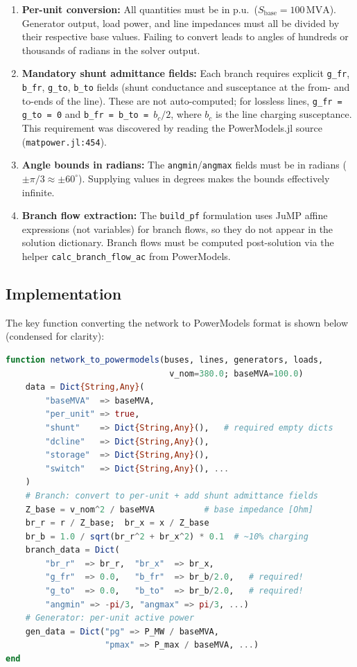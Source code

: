\begin{enumerate}
    \item \textbf{Per-unit conversion:} All quantities must be in p.u.\ ($S_\text{base} = 100\,\text{MVA}$). Generator output, load power, and line impedances must all be divided by their respective base values. Failing to convert leads to angles of hundreds or thousands of radians in the solver output.

    \item \textbf{Mandatory shunt admittance fields:} Each branch requires explicit \texttt{g\_fr}, \texttt{b\_fr}, \texttt{g\_to}, \texttt{b\_to} fields (shunt conductance and susceptance at the from- and to-ends of the line). These are not auto-computed; for lossless lines, \texttt{g\_fr = g\_to = 0} and \texttt{b\_fr = b\_to = $b_c/2$}, where $b_c$ is the line charging susceptance. This requirement was discovered by reading the PowerModels.jl source (\texttt{matpower.jl:454}).

    \item \textbf{Angle bounds in radians:} The \texttt{angmin}/\texttt{angmax} fields must be in radians ($\pm\pi/3 \approx \pm60^{\circ}$). Supplying values in degrees makes the bounds effectively infinite.

    \item \textbf{Branch flow extraction:} The \texttt{build\_pf} formulation uses JuMP affine expressions (not variables) for branch flows, so they do not appear in the solution dictionary. Branch flows must be computed post-solution via the helper \texttt{calc\_branch\_flow\_ac} from PowerModels.
\end{enumerate}

\subsection{Implementation}

The key function converting the network to PowerModels format is shown below (condensed for clarity):

\begin{lstlisting}[language=Julia, caption={PowerModels.jl data format construction (key fields)}, label={lst:ac_format}]
function network_to_powermodels(buses, lines, generators, loads,
                                 v_nom=380.0; baseMVA=100.0)
    data = Dict{String,Any}(
        "baseMVA"  => baseMVA,
        "per_unit" => true,
        "shunt"    => Dict{String,Any}(),   # required empty dicts
        "dcline"   => Dict{String,Any}(),
        "storage"  => Dict{String,Any}(),
        "switch"   => Dict{String,Any}(), ...
    )
    # Branch: convert to per-unit + add shunt admittance fields
    Z_base = v_nom^2 / baseMVA          # base impedance [Ohm]
    br_r = r / Z_base;  br_x = x / Z_base
    br_b = 1.0 / sqrt(br_r^2 + br_x^2) * 0.1  # ~10% charging
    branch_data = Dict(
        "br_r"  => br_r,  "br_x"  => br_x,
        "g_fr"  => 0.0,   "b_fr"  => br_b/2.0,   # required!
        "g_to"  => 0.0,   "b_to"  => br_b/2.0,   # required!
        "angmin" => -pi/3, "angmax" => pi/3, ...)
    # Generator: per-unit active power
    gen_data = Dict("pg" => P_MW / baseMVA,
                    "pmax" => P_max / baseMVA, ...)
end
\end{lstlisting}

